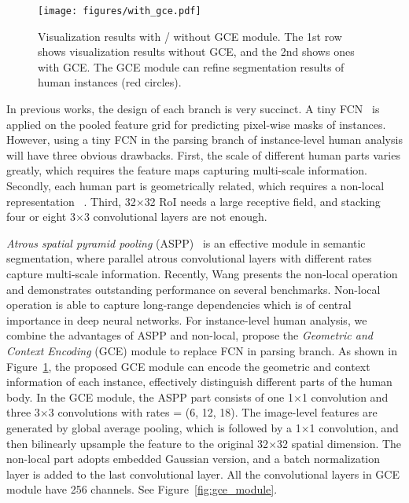 \documentclass[10pt,twocolumn,letterpaper]{article}
\begin{document}
\begin{figure}[t]
\begin{center}
\texttt{[image: figures/with\_gce.pdf]}
\end{center}
\caption{Visualization results with / without GCE module. The 1st row shows visualization results without GCE, and the 2nd shows ones with GCE. The GCE module can refine segmentation results of human instances (red circles).}
\label{fig:with_gce}
\end{figure}

In previous works, the design of each branch is very succinct. A tiny FCN~\cite{Long_cvpr2015_fcn} is applied on the pooled feature grid for predicting pixel-wise masks of instances. However, using a tiny FCN in the parsing branch of instance-level human analysis will have three obvious drawbacks. First, the scale of different human parts varies greatly, which requires the feature maps capturing multi-scale information. Secondly, each human part is geometrically related, which requires a non-local representation~\cite{Buades_cvpr2005_nonlocal} . Third, 32$\times$32 RoI needs a large receptive field, and stacking four or eight 3$\times$3 convolutional layers are not enough. 

\emph{Atrous spatial pyramid pooling} (ASPP)~\cite{Chen_tpami2016_deeplab, Chen_arxiv2017_deeplabv3, Chen_eccv2018_deeplabv3plus} is an effective module in semantic segmentation, where parallel atrous convolutional layers with different rates capture multi-scale information. Recently, Wang \etal presents the non-local operation and demonstrates outstanding performance on several benchmarks. Non-local~\cite{Wang_cvpr2018_nonlocal} operation is able to capture long-range dependencies which is of central importance in deep neural networks. For instance-level human analysis, we combine the advantages of ASPP and non-local, propose the \emph{Geometric and Context Encoding} (GCE) module to replace FCN in parsing branch. As shown in Figure~\ref{fig:with_gce}, the proposed GCE module can encode the geometric and context information of each instance, effectively distinguish different parts of the human body. In the GCE module, the ASPP part consists of one 1$\times$1 convolution and three 3$\times$3 convolutions with rates = (6, 12, 18). The image-level features are generated by global average pooling, which is followed by a 1$\times$1 convolution, and then bilinearly upsample the feature to the original 32$\times$32 spatial dimension. The non-local part adopts embedded Gaussian version, and a batch normalization~\cite{Ioffe_icml2015_bn} layer is added to the last convolutional layer. All the convolutional layers in GCE module have 256 channels. See Figure~\ref{fig:gce_module}.
\end{document}
